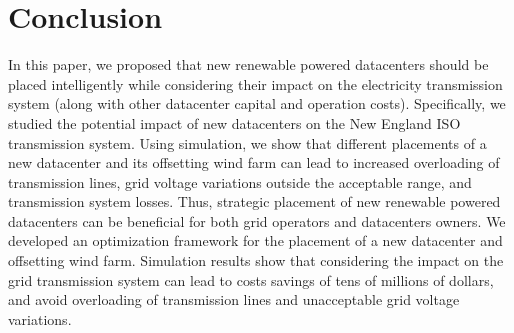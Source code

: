 \section{Conclusion}
\label{sec:conclusion}

In this paper, we proposed that new renewable powered datacenters should be placed intelligently while considering their impact on the electricity transmission system (along with other datacenter capital and operation costs).  Specifically, we studied the potential impact of new datacenters on the New England ISO transmission system.  Using simulation, we show that different placements of a new datacenter and its offsetting wind farm can lead to increased overloading of transmission lines, grid voltage variations outside the acceptable range, and transmission system losses.  Thus, strategic placement of new renewable powered datacenters can be beneficial for both grid operators and datacenters owners.  We developed an optimization framework for the placement of a new datacenter and offsetting wind farm.  Simulation results show that considering the impact on the grid transmission system can lead to costs savings of tens of millions of dollars, and avoid overloading of transmission lines and unacceptable grid voltage variations.



